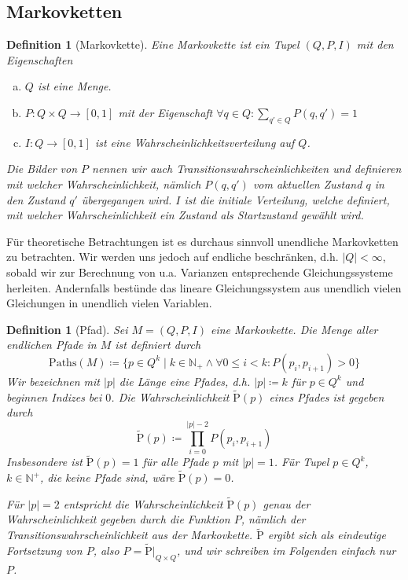 \documentclass[a4paper]{article}
\newtheorem{definition}[satz]{Definition} %
\theoremstyle{nonumberplain}
\begin{document}
\subsection{Markovketten}

\newcommand{\mc}{Markovkette}
\newcommand{\mcex}{$M = (Q, P, I)$}
\begin{definition}[\mc]\label{def-mc}
	Eine \mc{} ist ein Tupel $(Q, P, I)$ mit den Eigenschaften
	\begin{enumerate}[(a)]
		\item $Q$ ist eine Menge.
		\item $P : Q \times Q \to [0,1]$ mit der Eigenschaft $\forall q \in Q : \sum_{q' \in Q}{P(q,q') = 1}$
		\item $I : Q \to [0,1]$ ist eine Wahrscheinlichkeitsverteilung auf $Q$.
	\end{enumerate}	
	Die Bilder von $P$ nennen wir auch Transitionswahrscheinlichkeiten und definieren mit welcher Wahrscheinlichkeit, nämlich $P(q,q')$ vom aktuellen Zustand $q$ in den Zustand $q'$ übergegangen wird. $I$ ist die initiale Verteilung, welche definiert, mit welcher Wahrscheinlichkeit ein Zustand als Startzustand gewählt wird.
\end{definition}

Für theoretische Betrachtungen ist es durchaus sinnvoll unendliche \mc{}n zu betrachten. Wir werden uns jedoch auf endliche beschränken, d.h. $|Q| < \infty$, sobald wir zur Berechnung von u.a. Varianzen entsprechende Gleichungssysteme herleiten. Andernfalls bestünde das lineare Gleichungssystem aus unendlich vielen Gleichungen in unendlich vielen Variablen.

\newcommand{\gpath}{Pfad}
\newcommand{\pfin}{\mathrm{Paths}}%
\begin{definition}[\gpath]\label{def-path}
	Sei \mcex{} eine \mc{}. Die Menge aller endlichen \gpath e in $M$ ist definiert durch
	\begin{equation}
		\pfin(M) \coloneqq \{p \in Q^{k} \mid k \in \mathbb{N}_{+} \land \forall 0 \leq i < k : P(p_i,p_{i+1}) > 0\}
	\end{equation}
	Wir bezeichnen mit $|p|$ die Länge eine Pfades, d.h. $|p| \coloneqq k$ für $p \in Q^k$ und beginnen Indizes bei $0$.
	Die Wahrscheinlichkeit $\mathrm{\tilde{P}}(p)$ eines Pfades ist gegeben durch
	\begin{equation}
		\mathrm{\tilde{P}}(p) \coloneqq \prod_{i = 0}^{|p| - 2}{P(p_i,p_{i+1})}
	\end{equation}
	Insbesondere ist $\mathrm{\tilde{P}}(p) = 1$ für alle Pfade $p$ mit $|p| = 1$. Für Tupel $p \in Q^k$, $k \in \mathbb{N}^+$, die keine Pfade sind, wäre $\mathrm{\tilde{P}}(p) = 0$.
	
	Für $|p| = 2$ entspricht die Wahrscheinlichkeit $\mathrm{\tilde{P}}(p)$ genau der Wahrscheinlichkeit gegeben durch die Funktion $P$, nämlich der Transitionswahrscheinlichkeit aus der Markovkette. $\mathrm{\tilde{P}}$ ergibt sich als eindeutige Fortsetzung von $P$, also $P = \mathrm{\tilde{P}}\vert_{Q\times Q}$, und wir schreiben im Folgenden einfach nur $P$.
\end{definition}
\end{document}
